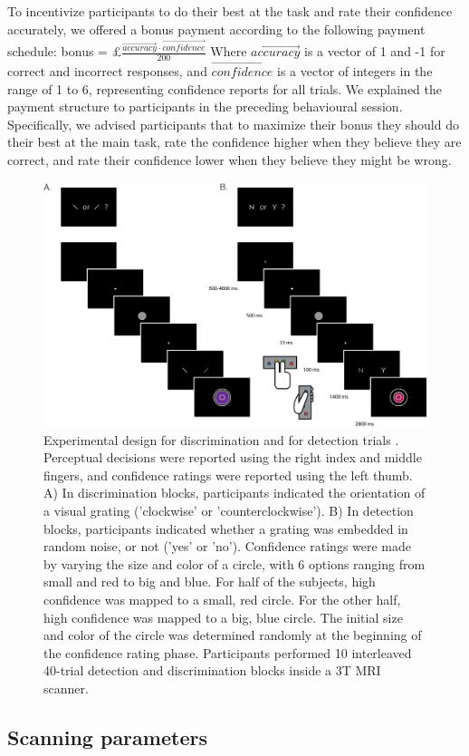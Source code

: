 \documentclass[12pt,twoside]{reedthesis}
\begin{document}
To incentivize participants to do their best at the task and rate their confidence accurately, we offered a bonus payment according to the following payment schedule:
bonus = £\(\frac{\overrightarrow{accuracy} \cdot \overrightarrow{confidence}}{200}\)
Where \(\overrightarrow{accuracy}\) is a vector of 1 and -1 for correct and incorrect responses, and \(\overrightarrow{confidence}\) is a vector of integers in the range of 1 to 6, representing confidence reports for all trials. We explained the payment structure to participants in the preceding behavioural session. Specifically, we advised participants that to maximize their bonus they should do their best at the main task, rate the confidence higher when they believe they are correct, and rate their confidence lower when they believe they might be wrong.
\begin{figure}
\includegraphics[width=\linewidth]{figure/fMRI/design} \caption[Experimental design, imaging experiment]{Experimental design for discrimination and for detection trials . Perceptual decisions were reported using the right index and middle fingers, and confidence ratings were reported using the left thumb. A) In discrimination blocks, participants indicated the orientation of a visual grating ('clockwise' or 'counterclockwise'). B) In detection blocks, participants indicated whether a grating was embedded in random noise, or not ('yes' or 'no'). Confidence ratings were made by varying the size and color of a circle, with 6 options ranging from small and red to big and blue. For half of the subjects, high confidence was mapped to a small, red circle. For the other half, high confidence was mapped to a big, blue circle. The initial size and color of the circle was determined randomly at the beginning of the confidence rating phase. Participants performed 10 interleaved 40-trial detection and discrimination blocks inside a 3T MRI scanner.}\label{fig:fMRI-exp1-design}
\end{figure}
\hypertarget{scanning-parameters}{%
\subsection{Scanning parameters}\label{scanning-parameters}}
\end{document}
